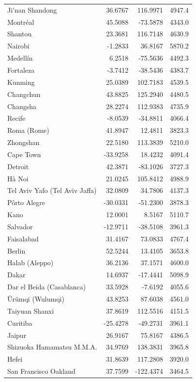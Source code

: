 \begin{longtable}{lrrc}
Ji'nan  Shandong & 36.6767 & 116.9971 & 4947.4 \\
Montréal & 45.5088 & -73.5878 & 4343.0 \\
Shantou & 23.3681 & 116.7148 & 4630.9 \\
Nairobi & -1.2833 & 36.8167 & 5870.2 \\
Medellín & 6.2518 & -75.5636 & 4492.3 \\
Fortaleza & -3.7412 & -38.5436 & 4383.7 \\
Kunming & 25.0389 & 102.7183 & 4539.5 \\
Changchun & 43.8825 & 125.2940 & 4480.5 \\
Changsha & 28.2274 & 112.9383 & 4735.9 \\
Recife & -8.0539 & -34.8811 & 4066.4 \\
Roma (Rome) & 41.8947 & 12.4811 & 3823.3 \\
Zhongshan & 22.5180 & 113.3839 & 5210.0 \\
Cape Town & -33.9258 & 18.4232 & 4091.4 \\
Detroit & 42.3871 & -83.1026 & 3727.3 \\
Hà Noi & 21.0245 & 105.8412 & 4988.9 \\
Tel Aviv Yafo (Tel Aviv Jaffa) & 32.0809 & 34.7806 & 4137.3 \\
Pôrto Alegre & -30.0331 & -51.2300 & 3878.3 \\
Kano & 12.0001 & 8.5167 & 5110.7 \\
Salvador & -12.9711 & -38.5108 & 3961.3 \\
Faisalabad & 31.4167 & 73.0833 & 4767.4 \\
Berlin & 52.5244 & 13.4105 & 3653.8 \\
Halab (Aleppo) & 36.2136 & 37.1571 & 4600.0 \\
Dakar & 14.6937 & -17.4441 & 5098.9 \\
Dar el Beida (Casablanca) & 33.5928 & -7.6192 & 4055.6 \\
Ürümqi (Wulumqi) & 43.8253 & 87.6038 & 4561.0 \\
Taiyuan  Shanxi & 37.8619 & 112.5516 & 4151.5 \\
Curitiba & -25.4278 & -49.2731 & 3961.1 \\
Jaipur & 26.9167 & 75.8167 & 4386.5 \\
Shizuoka Hamamatsu M.M.A. & 34.9769 & 138.3831 & 3965.8 \\
Hefei & 31.8639 & 117.2808 & 3920.0 \\
San Francisco Oakland & 37.7599 & -122.4374 & 3464.5 \\

\end{longtable}
